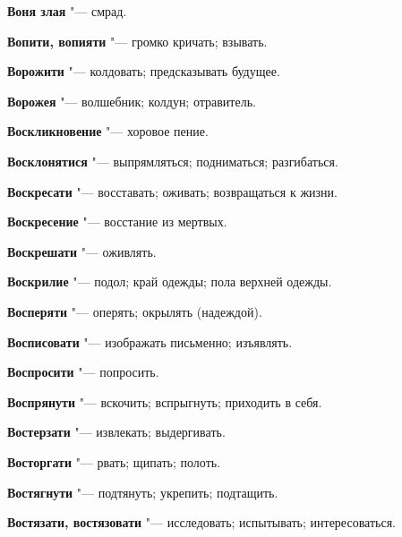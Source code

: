 \begin{mymulticols}{2}
\noindent\textbf{Воня злая} "--- смрад. 




\noindent\textbf{Вопити, вопияти} "--- громко кричать; взывать. 




\noindent\textbf{Ворожити} "--- колдовать; предсказывать будущее. 




\noindent\textbf{Ворожея} "--- волшебник; колдун; отравитель. 




\noindent\textbf{Воскликновение} "--- хоровое пение. 




\noindent\textbf{Восклонятися} "--- выпрямляться; подниматься; разгибаться. 




\noindent\textbf{Воскресати} "--- восставать; оживать; возвращаться к жизни. 




\noindent\textbf{Воскресение} "--- восстание из мертвых. 




\noindent\textbf{Воскрешати} "--- оживлять. 




\noindent\textbf{Воскрилие} "--- подол; край одежды; пола верхней одежды. 




\noindent\textbf{Восперяти} "--- оперять; окрылять (надеждой). 




\noindent\textbf{Восписовати} "--- изображать письменно; изъявлять. 




\noindent\textbf{Воспросити} "--- попросить. 




\noindent\textbf{Воспрянути} "--- вскочить; вспрыгнуть; приходить в себя. 




\noindent\textbf{Востерзати} "--- извлекать; выдергивать. 




\noindent\textbf{Восторгати} "--- рвать; щипать; полоть. 




\noindent\textbf{Востягнути} "--- подтянуть; укрепить; подтащить. 




\noindent\textbf{Востязати, востязовати} "--- исследовать; испытывать; интересоваться. 





\end{mymulticols}
